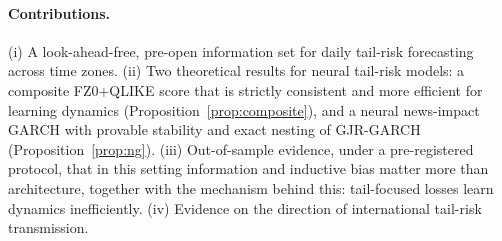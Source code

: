 \paragraph{Contributions.} (i) A look-ahead-free, pre-open information set for daily tail-risk forecasting across time zones. (ii) Two theoretical results for neural tail-risk models: a composite FZ0+QLIKE score that is strictly consistent and more efficient for learning dynamics (Proposition~\ref{prop:composite}), and a neural news-impact GARCH with provable stability and exact nesting of GJR-GARCH (Proposition~\ref{prop:ng}). (iii) Out-of-sample evidence, under a pre-registered protocol, that in this setting information and inductive bias matter more than architecture, together with the mechanism behind this: tail-focused losses learn dynamics inefficiently. (iv) Evidence on the direction of international tail-risk transmission.
